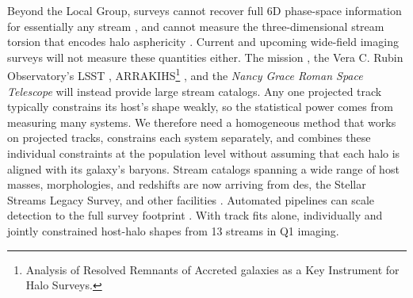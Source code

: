 \documentclass[linenumbers,twocolumn]{aastex701}
\begin{document}
    Beyond the Local Group, surveys cannot recover full 6D phase-space information for essentially any stream \citep{Martinez-Delgado+:2010:StellarTidalStreams}, and cannot measure the three-dimensional stream torsion that encodes halo asphericity \citep{Bariego-Quintana:2024:TorsionStellarStreams}. %
    Current and upcoming wide-field imaging surveys will not measure these quantities either. %
    The \euclid{} mission \citep{EuclidCollaboration+:2025:EuclidQuickData,Euclid+Walmsley+:2025:Q1}, the Vera C. Rubin Observatory's \gls{LSST} \citep{Ivezic+:2019:LSSTScienceDrivers}, \gls{ARRAKIHS}\footnote{Analysis of Resolved Remnants of Accreted galaxies as a Key Instrument for Halo Surveys.} \citep{Guzman+:2022:ARRAKIHS}, and the \textsl{Nancy Grace Roman Space Telescope} \citep{Spergel+:2015:WideFieldInfrarRedSurvey} will instead provide large stream catalogs. %
    Any one projected track typically constrains its host's shape weakly, so the statistical power comes from measuring many systems. %
    We therefore need a homogeneous method that works on projected tracks, constrains each system separately, and combines these individual constraints at the population level without assuming that each halo is aligned with its galaxy's baryons. %
    Stream catalogs spanning a wide range of host masses, morphologies, and redshifts are now arriving from \gls{des}, the Stellar Streams Legacy Survey, and other facilities \citep{Miro-Carretero+:2024:ExtragalacticStellarTidal,Miro-Carretero+:2025:ExtragalacticStellarTidal,Martinez-Delgado+:2025:StellarTidalStreams, Sola+:2025}. %
    Automated pipelines can scale detection to the full survey footprint \citep{Walmsley+:2023:ZoobotAdaptableDeep,Gordon+:2024:UncoveringTidalTreasures}. %
    With track fits alone, \citet{Starkman+:2026:EuclidQ1} individually and jointly constrained host-halo shapes from 13 streams in \euclid{} Q1 imaging. %
\end{document}
